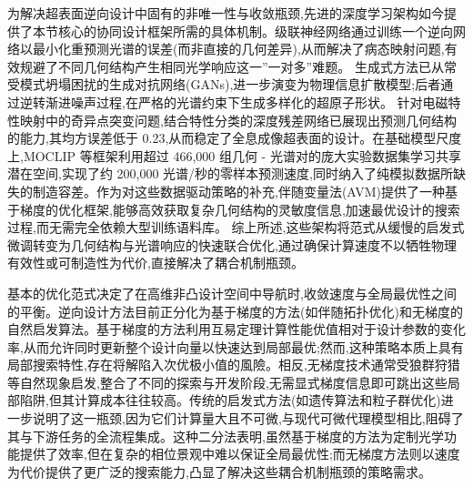 \documentclass[11pt]{article}
\begin{document}
为解决超表面逆向设计中固有的非唯一性与收敛瓶颈,先进的深度学习架构如今提供了本节核心的协同设计框架所需的具体机制。级联神经网络通过训练一个逆向网络以最小化重预测光谱的误差(而非直接的几何差异),从而解决了病态映射问题,有效规避了不同几何结构产生相同光学响应这一''一对多''难题。\citep{doi_10_1063_5_0171437_92a49ec0} \citep{doi_10_1515_nanoph_2021_0434_1357d09e} 生成式方法已从常受模式坍塌困扰的生成对抗网络(GANs),进一步演变为物理信息扩散模型;后者通过逆转渐进噪声过程,在严格的光谱约束下生成多样化的超原子形状。\citep{doi_10_71465_fapm546_bda368a5} 针对电磁特性映射中的奇异点突变问题,结合特性分类的深度残差网络已展现出预测几何结构的能力,其均方误差低于 0.23,从而稳定了全息成像超表面的设计。在基础模型尺度上,MOCLIP 等框架利用超过 466,000 组几何 - 光谱对的庞大实验数据集学习共享潜在空间,实现了约 200,000 光谱/秒的零样本预测速度,同时纳入了纯模拟数据所缺失的制造容差。作为对这些数据驱动策略的补充,伴随变量法(AVM)提供了一种基于梯度的优化框架,能够高效获取复杂几何结构的灵敏度信息,加速最优设计的搜索过程,而无需完全依赖大型训练语料库。\citep{doi_10_2528_pier12020501_bb5007b1} \citep{doi_10_1109_nemo62710_2025_11215427_067e96bb} 综上所述,这些架构将范式从缓慢的启发式微调转变为几何结构与光谱响应的快速联合优化,通过确保计算速度不以牺牲物理有效性或可制造性为代价,直接解决了耦合机制瓶颈。\citep{doi_10_1038_s41467_026_76714_x_8ca5d39b} \citep{doi_10_71465_fapm546_bda368a5} \citep{doi_10_1109_iccem60619_2024_10559188_c3199408} \citep{doi_10_1109_pn62551_2024_10621761_0bc70b78}

基本的优化范式决定了在高维非凸设计空间中导航时,收敛速度与全局最优性之间的平衡。逆向设计方法目前正分化为基于梯度的方法(如伴随拓扑优化)和无梯度的自然启发算法。基于梯度的方法利用互易定理计算性能优值相对于设计参数的变化率,从而允许同时更新整个设计向量以快速达到局部最优;然而,这种策略本质上具有局部搜索特性,存在将解陷入次优极小值的風險。相反,无梯度技术通常受狼群狩猎等自然现象启发,整合了不同的探索与开发阶段,无需显式梯度信息即可跳出这些局部陷阱,但其计算成本往往较高。传统的启发式方法(如遗传算法和粒子群优化)进一步说明了这一瓶颈,因为它们计算量大且不可微,与现代可微代理模型相比,阻碍了其与下游任务的全流程集成。这种二分法表明,虽然基于梯度的方法为定制光学功能提供了效率,但在复杂的相位景观中难以保证全局最优性;而无梯度方法则以速度为代价提供了更广泛的搜索能力,凸显了解决这些耦合机制瓶颈的策略需求。\citep{s2_2516273dc5b4511c838bf9236a61f71f4e32f6b5_1724698f} \citep{doi_10_1088_1367_2630_acfcd6_32444f17} \citep{s2_76a83ea3baed75ad88b7f0782eb9a694a330c853_cee16cac}
\end{document}
